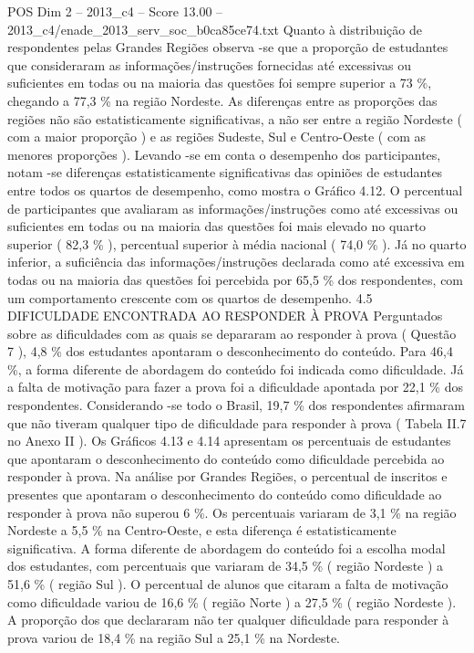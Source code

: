 \begin{textsample}{POS Dim 2 – 2013\_c4 – Score 13.00 – 2013\_c4/enade\_2013\_serv\_soc\_b0ca85ce74.txt}
Quanto à distribuição de respondentes pelas Grandes Regiões observa -se que a proporção de estudantes que consideraram as informações/instruções fornecidas até excessivas ou suficientes em todas ou na maioria das questões foi sempre superior a 73 \%, chegando a 77,3 \% na região Nordeste.
As diferenças entre as proporções das regiões não são estatisticamente significativas, a não ser entre a região Nordeste ( com a maior proporção ) e as regiões Sudeste, Sul e Centro-Oeste ( com as menores proporções ).
Levando -se em conta o desempenho dos participantes, notam -se diferenças estatisticamente significativas das opiniões de estudantes entre todos os quartos de desempenho, como mostra o Gráfico 4.12.
O percentual de participantes que avaliaram as informações/instruções como até excessivas ou suficientes em todas ou na maioria das questões foi mais elevado no quarto superior ( 82,3 \% ), percentual superior à média nacional ( 74,0 \% ).
Já no quarto inferior, a suficiência das informações/instruções declarada como até excessiva em todas ou na maioria das questões foi percebida por 65,5 \% dos respondentes, com um comportamento crescente com os quartos de desempenho. 4.5 DIFICULDADE ENCONTRADA AO RESPONDER À PROVA Perguntados sobre as dificuldades com as quais se depararam ao responder à prova ( Questão 7 ), 4,8 \% dos estudantes apontaram o desconhecimento do conteúdo.
Para 46,4 \%, a forma diferente de abordagem do conteúdo foi indicada como dificuldade.
Já a falta de motivação para fazer a prova foi a dificuldade apontada por 22,1 \% dos respondentes.
Considerando -se todo o Brasil, 19,7 \% dos respondentes afirmaram que não tiveram qualquer tipo de dificuldade para responder à prova ( Tabela II.7 no Anexo II ).
Os Gráficos 4.13 e 4.14 apresentam os percentuais de estudantes que apontaram o desconhecimento do conteúdo como dificuldade percebida ao responder à prova.
Na análise por Grandes Regiões, o percentual de inscritos e presentes que apontaram o desconhecimento do conteúdo como dificuldade ao responder à prova não superou 6 \%.
Os percentuais variaram de 3,1 \% na região Nordeste a 5,5 \% na Centro-Oeste, e esta diferença é estatisticamente significativa.
A forma diferente de abordagem do conteúdo foi a escolha modal dos estudantes, com percentuais que variaram de 34,5 \% ( região Nordeste ) a 51,6 \% ( região Sul ).
O percentual de alunos que citaram a falta de motivação como dificuldade variou de 16,6 \% ( região Norte ) a 27,5 \% ( região Nordeste ).
A proporção dos que declararam não ter qualquer dificuldade para responder à prova variou de 18,4 \% na região Sul a 25,1 \% na Nordeste.

\end{textsample}
